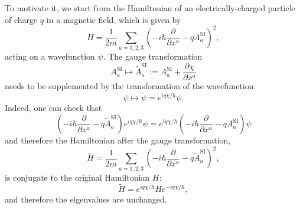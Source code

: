 \documentclass[12pt]{article}
\numberwithin{equation}{section}
\theoremstyle{remark}
\begin{document}
To motivate it, we start from the Hamiltonian of an electrically-charged particle of charge $q$ in a magnetic field, which is given by \begin{equation}
H = \frac{1}{2m} \sum_{a=1,2,3}\left( -i\hbar\frac{\partial}{\partial x^a} - q A^\text{SI}_a \right)^2 ,
\end{equation}
acting on a wavefunction $\psi$. 
The gauge transformation \begin{equation}
A^\text{SI}_a \mapsto \tilde A^\text{SI}_a:=A^\text{SI}_a + \frac{\partial \chi}{\partial x^a}
\end{equation} needs to be supplemented by the transformation of the wavefunction \begin{equation}
\psi \mapsto \tilde \psi = e^{iq\chi/\hbar} \psi. \label{eq:gauge-tr}
\end{equation}
Indeed, one can check that \begin{equation}
  \left( -i\hbar\frac{\partial}{\partial x^a} - q \tilde A^\text{SI}_a \right) 
  e^{iq\chi/\hbar}\psi=
  e^{iq\chi/\hbar} \left( -i\hbar\frac{\partial}{\partial x^a} - q A^\text{SI}_a \right) \psi
\end{equation}
and therefore the Hamiltonian after the gauge transformation, \begin{equation}
\tilde H= \frac{1}{2m} \sum_{a=1,2,3}\left( -i\hbar\frac{\partial}{\partial x^a} - q \tilde A^\text{SI}_a \right)^2,
\end{equation} is conjugate to the original Hamiltonian $H$: \begin{equation}
\tilde H = e^{iq\chi/\hbar} H e^{-iq\chi/\hbar},
\end{equation} and therefore the eigenvalues are unchanged. 
\end{document}
